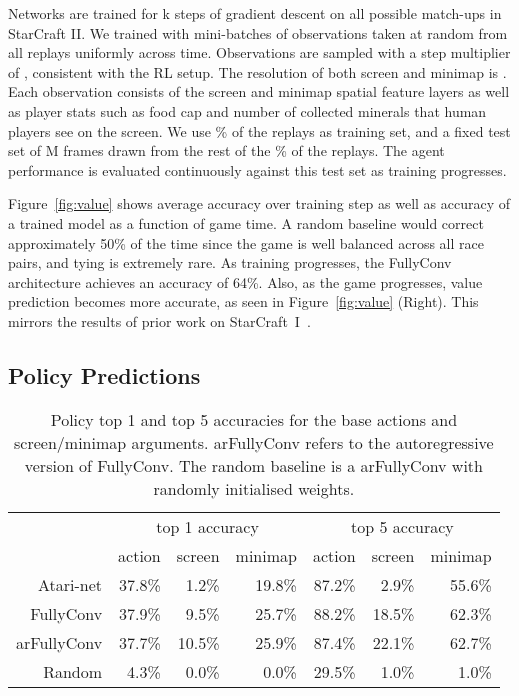\documentclass{article}
\begin{document}
Networks are trained for k steps of gradient descent on all possible match-ups in StarCraft II.
We trained with mini-batches of  observations taken at random from all replays uniformly across time. Observations are sampled with a step multiplier of , consistent with the RL setup. The resolution of both screen and minimap is . Each observation consists of the screen and minimap spatial feature layers as well as player stats such as food cap and number of collected minerals that human players see on the screen.
We use \% of the replays as training set, and a fixed test set of M frames drawn from the rest of the \% of the replays. The agent performance is evaluated continuously against this test set as training progresses.  

Figure~\ref{fig:value} shows average accuracy over training step as well as accuracy of a trained model as a function of game time.
A random baseline would correct approximately 50\% of the time since the game is well balanced across all race pairs, and tying is extremely rare. As training progresses, the FullyConv architecture achieves an accuracy of 64\%.  Also, as the game progresses, value prediction becomes more accurate, as seen in Figure~\ref{fig:value} (Right). This mirrors the results of prior work on StarCraft~I~\cite{erickson2014global}.

\subsection{Policy Predictions}

\begin{table}[htp]
\centering
 \begin{tabular}{ r | r r r | r r r } 
& \multicolumn{3}{c|}{\sc top 1 accuracy} & \multicolumn{3}{c}{
 \sc top 5 accuracy}  \\
 \cline{2-7}
& \sc action & \sc screen & \sc minimap & \sc action & \sc screen & \sc minimap  \\ 
 \hline
\sc Atari-net & 37.8\%	& 1.2\%	& 19.8\% & 87.2\% & 2.9\% & 55.6\% \\
 \sc FullyConv & 37.9\% &	9.5\% &	25.7\% & 88.2\% &	18.5\% &	62.3\% \\
 \sc arFullyConv & 37.7\% &	10.5\% &	25.9\% &	87.4\% &	22.1\% &	62.7\% \\ 
 \hline
 \sc Random & 4.3\% &	0.0\% & 0.0\% & 29.5\% &	1.0\% &	1.0\% \\
\end{tabular}
\caption{Policy top 1 and top 5 accuracies for the base actions and screen/minimap arguments. 
arFullyConv refers to the autoregressive version of  FullyConv. The random baseline is a arFullyConv with randomly initialised weights.}\label{tab:policy}
\end{table}
\end{document}
